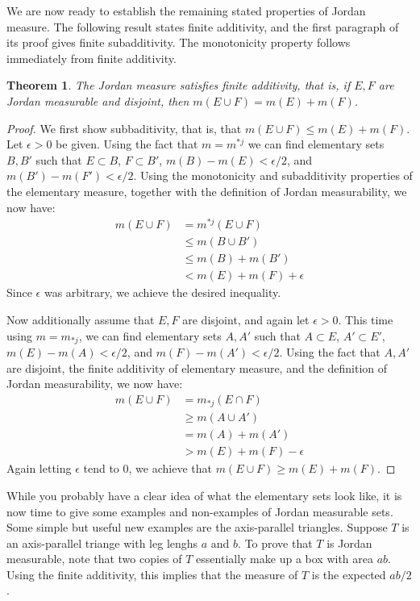 \documentclass[11pt,oneside]{amsbook}
\theoremstyle{definition}
\theoremstyle{plain}
\newtheorem{thm}{Theorem}[section]
\theoremstyle{definition}
\theoremstyle{remark}
\numberwithin{equation}{section}
\numberwithin{figure}{section}
\begin{document}
We are now ready to establish the remaining stated properties of Jordan measure. The following result states finite additivity, and the first paragraph of its proof gives finite subadditivity. The monotonicity property follows immediately from finite additivity.

\begin{thm}
  The Jordan measure satisfies finite additivity, that is, if $E,F$ are Jordan measurable and disjoint, then $m(E\cup F)=m(E)+m(F)$.
\end{thm}

\begin{proof}
  We first show subbaditivity, that is, that $m(E\cup F)\leq m(E)+m(F)$. Let $\epsilon>0$ be given. Using the fact that $m=m^{*j}$ we can find elementary sets $B,B'$ such that $E\subset B$, $F\subset B'$, $m(B)-m(E)<\epsilon/2$, and $m(B')-m(F')<\epsilon/2$. Using the monotonicity and subadditivity properties of the elementary measure, together with the definition of Jordan measurability, we now have:
  \begin{align*}
    m(E\cup F)&=m^{*j}(E\cup F)\\
              &\leq m(B\cup B')\\
              &\leq m(B)+m(B')\\
              &< m(E)+m(F)+\epsilon
  \end{align*}
  Since $\epsilon$ was arbitrary, we achieve the desired inequality.
  
  Now additionally assume that $E,F$ are disjoint, and again let $\epsilon>0$. This time using $m=m_{*j}$, we can find elementary sets $A,A'$ such that $A\subset E$, $A'\subset E'$, $m(E)-m(A)<\epsilon/2$, and $m(F)-m(A')<\epsilon/2$. Using the fact that $A,A'$ are disjoint, the finite additivity of elementary measure, and the definition of Jordan measurability, we now have:
  \begin{align*}
    m(E\cup F)&=m_{*j}(E\cap F)\\
              &\geq m(A\cup A')\\
              &=m(A)+m(A')\\
              &>m(E)+m(F)-\epsilon
  \end{align*}
  Again letting $\epsilon$ tend to $0$, we achieve that $m(E\cup F)\geq m(E)+m(F)$.
\end{proof}

While you probably have a clear idea of what the elementary sets look like, it is now time to give some examples and non-examples of Jordan measurable sets. Some simple but useful new examples are the axis-parallel triangles. Suppose $T$ is an axis-parallel triange with leg lenghs $a$ and $b$. To prove that $T$ is Jordan measurable, note that two copies of $T$ essentially make up a box with area $ab$. Using the finite additivity, this implies that the measure of $T$ is the expected $ab/2$.
\end{document}
